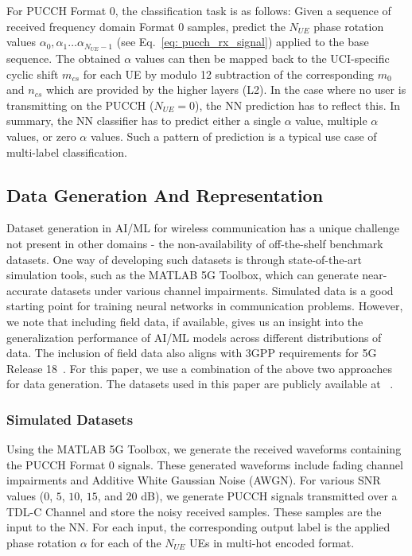 \documentclass[journal]{IEEEtran}
\begin{document}
For PUCCH Format 0, the classification task is as follows: Given a sequence of received frequency domain Format 0 samples, predict the $N_{UE}$ phase rotation values $\alpha_{0}, \alpha_{1} \dots \alpha_{N_{UE}-1} $ (see Eq.~\eqref{eq: pucch_rx_signal}) applied to the base sequence. The obtained $\alpha$ values can then be mapped back to the UCI-specific cyclic shift $m_{cs}$ for each UE by modulo 12 subtraction of the corresponding $m_{0}$ and $n_{cs}$ which are provided by the higher layers (L2). 
In the case where no user is transmitting on the PUCCH ($N_{UE} = 0$), the NN prediction has to reflect this. In summary, the NN classifier has to predict either a single $\alpha$ value, multiple $\alpha$ values, or zero $\alpha$ values. Such a pattern of prediction is a typical use case of multi-label classification. 

\subsection{Data Generation And Representation}
Dataset generation in AI/ML for wireless communication has a unique challenge not present in other domains - the non-availability of off-the-shelf benchmark datasets. One way of developing such datasets is through state-of-the-art simulation tools, such as the MATLAB 5G Toolbox, which can generate near-accurate datasets under various channel impairments. Simulated data is a good starting point for training neural networks in communication problems. However, we note that including field data, if available, gives us an insight into the generalization performance of AI/ML models across different distributions of data. The inclusion of field data also aligns with 3GPP requirements for 5G Release 18~\cite{3gpp_38_843}. For this paper, we use a combination of the above two approaches for data generation. The datasets used in this paper are publicly available at ~\cite{aiml_pucch_dataset}.

\subsubsection{Simulated Datasets} 
Using the MATLAB 5G Toolbox, we generate the received waveforms containing the PUCCH Format 0 signals. These generated waveforms include fading channel impairments and Additive White Gaussian Noise (AWGN). For various SNR values ($0$, $5$, $10$, $15$, and $20$ dB), we generate PUCCH signals transmitted over a TDL-C Channel and store the noisy received samples. These samples are the input to the NN. For each input, the corresponding output label is the applied phase rotation $\alpha$ for each of the $N_{UE}$ UEs in multi-hot encoded format. 
\end{document}
